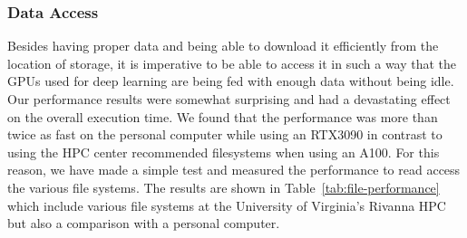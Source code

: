 \documentclass[utf8]{FrontiersinVancouver} %
\begin{document}
\subsubsection{Data Access}

Besides having proper data and being able to download it efficiently
from the location of storage, it is imperative to be able to access it
in such a way that the GPUs used for deep learning are being fed with
enough data without being idle. Our performance results were somewhat
surprising and had a devastating effect on the overall execution time. We found 
that the performance was more than twice as fast on the personal computer while using an RTX3090
in contrast to using the HPC center recommended filesystems when using
an A100. For this reason, we have made a simple test and measured the
performance to read access the various file systems. The results are
shown in Table~\ref{tab:file-performance} which include various file
systems at the University of Virginia's Rivanna HPC but also a
comparison with a personal computer.
\end{document}
